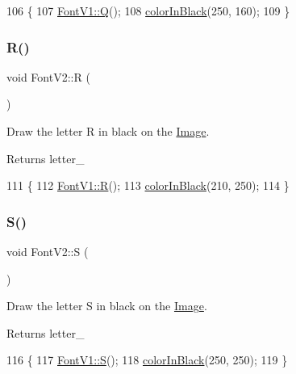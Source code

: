 \begin{DoxyCode}
106                \{
107     \mbox{\hyperlink{class_font_v1_af7ffd76bf02756d0d1e2d3eab4c65c40}{FontV1::Q}}();
108     \mbox{\hyperlink{class_font_v2_a04f2501961bc286ce70fbb6a840b0e8a}{colorInBlack}}(250, 160);
109 \}
\end{DoxyCode}
\mbox{\label{class_font_v2_a852e482795dc7557137419b713711774}} 
\subsubsection{\texorpdfstring{R()}{R()}}
{\footnotesize\ttfamily void Font\+V2\+::R (\begin{DoxyParamCaption}{ }\end{DoxyParamCaption})}



Draw the letter R in black on the \mbox{\hyperlink{class_image}{Image}}. 

\begin{DoxyReturn}{Returns}
letter\+\_\+ 
\end{DoxyReturn}

\begin{DoxyCode}
111                \{
112     \mbox{\hyperlink{class_font_v1_ab3f9a7e62f7d08792d9028da68f5787e}{FontV1::R}}();
113     \mbox{\hyperlink{class_font_v2_a04f2501961bc286ce70fbb6a840b0e8a}{colorInBlack}}(210, 250);
114 \}
\end{DoxyCode}
\mbox{\label{class_font_v2_adcccd6f866d51bb27568d8c4c465551f}} 
\subsubsection{\texorpdfstring{S()}{S()}}
{\footnotesize\ttfamily void Font\+V2\+::S (\begin{DoxyParamCaption}{ }\end{DoxyParamCaption})}



Draw the letter S in black on the \mbox{\hyperlink{class_image}{Image}}. 

\begin{DoxyReturn}{Returns}
letter\+\_\+ 
\end{DoxyReturn}

\begin{DoxyCode}
116                \{
117     \mbox{\hyperlink{class_font_v1_ab6daa08377051d5af458003c665cfc09}{FontV1::S}}();
118     \mbox{\hyperlink{class_font_v2_a04f2501961bc286ce70fbb6a840b0e8a}{colorInBlack}}(250, 250);
119 \}
\end{DoxyCode}
\mbox{\label{class_font_v2_a0311eabb37bc231b9b0c0a13cdc0e562}} 
